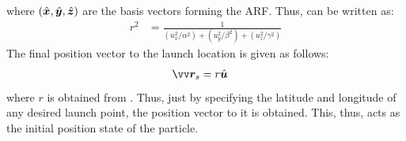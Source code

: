 where $(\hat{\bm{x}},\hat{\bm{y}},\hat{\bm{z}})$ are the basis vectors forming the \gls{ARF}. Thus,  can be written as:
\begin{align}
    r^2 &= \frac{1}{ (u_x^2/\alpha^2) + (u_y^2/\beta^2) + (u_z^2/\gamma^2) }
    \label{eqn:launch_loc_r_square_expanded}
\end{align}
The final position vector to the launch location is given as follows:
\begin{align}
    \bv{r}_s &= r\buvec{u}
    \label{eqn:launch_vector}
\end{align}
where $r$ is obtained from . Thus, just by specifying the latitude and longitude of any desired launch point, the position vector to it is obtained. This, thus, acts as the initial position state of the particle.

